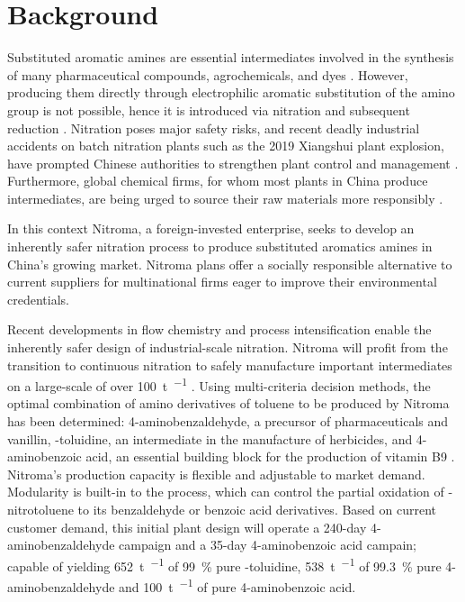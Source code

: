 \section*{Background}

Substituted aromatic amines are essential intermediates involved in the synthesis of many pharmaceutical compounds, agrochemicals, and dyes \cite{vogt_amines_2000}. However, producing them directly through electrophilic aromatic substitution of the amino group is not possible, hence it is introduced via nitration and subsequent reduction \cite{dugal_nitrobenzene_2005}. Nitration poses major safety risks, and recent deadly industrial accidents on batch nitration plants such as the 2019 Xiangshui plant explosion, have prompted Chinese authorities to strengthen plant control and management \cite{el_diario_china_2019}. Furthermore, global chemical firms, for whom most plants in China produce intermediates, are being urged to source their raw materials more responsibly \cite{stanway_global_2019}.

In this context Nitroma, a foreign-invested enterprise, seeks to develop an inherently safer nitration process to produce substituted aromatics amines in China's growing market. Nitroma plans offer a socially responsible alternative to current suppliers for multinational firms eager to improve their environmental credentials. 

Recent developments in flow chemistry and process intensification enable the inherently safer design of industrial-scale nitration. Nitroma will profit from the transition to continuous nitration to safely manufacture important intermediates on a large-scale of over \SI{100}{\tonne\per\year} \cite{di_miceli_raimondi_safety_2015}. Using multi-criteria decision methods, the optimal combination of amino derivatives of toluene to be produced by Nitroma has been determined: 4-aminobenzaldehyde, a precursor of pharmaceuticals and vanillin, \ortho-toluidine, an intermediate in the manufacture of herbicides, and 4-aminobenzoic acid, an essential building block for the production of vitamin B9 \cite{bowers_toluidines_2000,bruhne_benzaldehyde_2011,maki_benzoic_2000}.
Nitroma's production capacity is flexible and adjustable to market demand. Modularity is built-in to the process, which can control the partial oxidation of \para-nitrotoluene to its benzaldehyde or benzoic acid derivatives. Based on current customer demand, this initial plant design will operate a 240-day 4-aminobenzaldehyde campaign and a 35-day 4-aminobenzoic acid campain; capable of yielding \SI{652}{\tonne\per\year} of \SI{99}{\percent} pure \ortho-toluidine, \SI{538}{\tonne\per\year} of \SI{99.3}{\percent} pure 4-aminobenzaldehyde and \SI{100}{\tonne\per\year} of pure 4-aminobenzoic acid.

